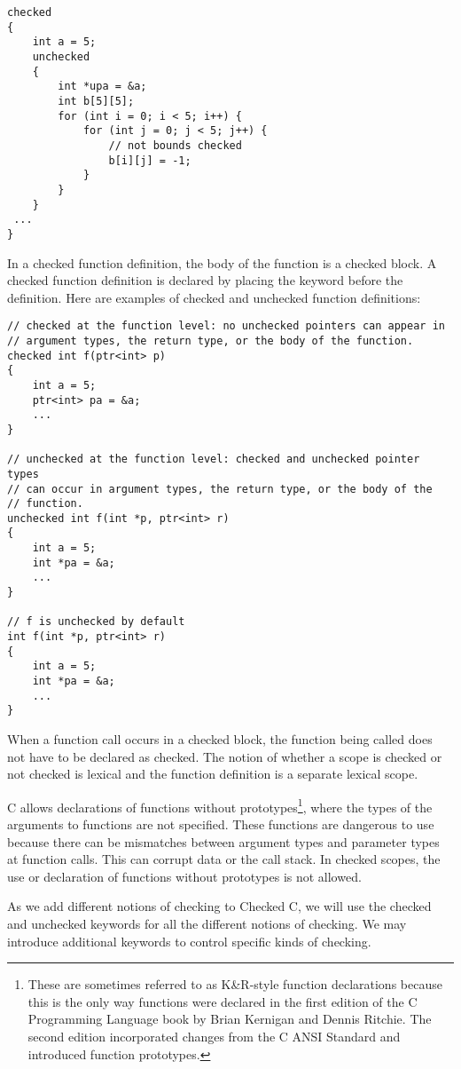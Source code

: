 \begin{lstlisting}
checked
{
    int a = 5;
    unchecked
    {
        int *upa = &a;
        int b[5][5];
        for (int i = 0; i < 5; i++) {
            for (int j = 0; j < 5; j++) {
                // not bounds checked
                b[i][j] = -1;
            }
        }
    }
 ...
}
\end{lstlisting}

In a checked function definition, the body of the function is a
checked  block. A checked function definition is declared by placing the
 keyword before the definition. Here are examples of checked and
unchecked function definitions:

\begin{lstlisting}
// checked at the function level: no unchecked pointers can appear in
// argument types, the return type, or the body of the function.
checked int f(ptr<int> p)
{
    int a = 5;
    ptr<int> pa = &a;
    ...
}

// unchecked at the function level: checked and unchecked pointer types
// can occur in argument types, the return type, or the body of the
// function.
unchecked int f(int *p, ptr<int> r)
{
    int a = 5;
    int *pa = &a;
    ...
}

// f is unchecked by default
int f(int *p, ptr<int> r)
{
    int a = 5;
    int *pa = &a;
    ...
}
\end{lstlisting}

When a function call occurs in a checked block, the function being
called does not have to be declared as checked. The notion of whether a
scope is checked or not checked is lexical and the function definition
is a separate lexical scope.

C allows declarations of functions without prototypes\footnote{These are sometimes
referred to as K\&R-style function declarations because this is the only way
functions were  declared in the first edition of the C Programming Language book
by Brian Kernigan and Dennis Ritchie. The second edition incorporated changes from the
C ANSI Standard and introduced function prototypes.}, where the types
of the arguments to functions are not specified.  These
functions are dangerous to use because there can be mismatches
between argument types and parameter types at function
calls.  This can corrupt data or the call stack.  In checked scopes,
the use or declaration of  functions without prototypes is not allowed.

As we add different notions of checking to Checked C, we will use the
checked and unchecked keywords for all the different notions of
checking. We may introduce additional keywords to control specific kinds
of checking.

